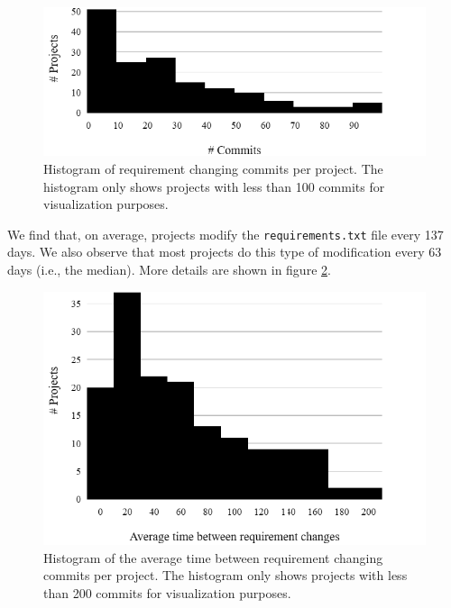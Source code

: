 \documentclass[conference]{IEEEtran}
\begin{document}
\begin{figure}[h]
\centering
\begin{minipage}[h]{0.8\columnwidth}
  \includegraphics[width=\linewidth]{figs/newplot (6).png}
  \caption{Histogram of requirement changing commits per project. The histogram only shows projects with less than 100 commits for visualization purposes.}
  \label{fig1}
\end{minipage}\hfill
\end{figure}

We find that, on average, projects modify the \texttt{requirements.txt} file every 137 days. We also observe that most projects do this type of modification every 63 days (i.e., the median). More details are shown in figure \ref{fig2}.

\begin{figure}[h]
\centering
\begin{minipage}[h]{0.75\columnwidth}
  \includegraphics[width=\linewidth]{figs/newplot (7).png}
  \caption{Histogram of the average time between requirement changing commits per project. The histogram only shows projects with less than 200 commits for visualization purposes.}
  \label{fig2}
\end{minipage}\hfill
\end{figure}
\end{document}
